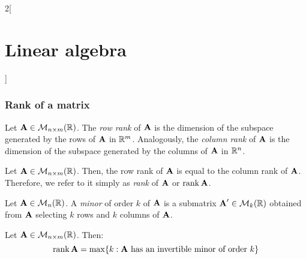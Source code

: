 \documentclass[../../../main_math.tex]{subfiles}
\begin{document}
\begin{multicols}{2}[\section{Linear algebra}]
  \subsubsection{Rank of a matrix}
  \begin{definition}
    Let $\boldsymbol{\mathrm{A}}\in\mathcal{M}_{n\times m}(\mathbb{R})$. The \emph{row rank} of $\boldsymbol{\mathrm{A}}$ is the dimension of the subspace generated by the rows of $\boldsymbol{\mathrm{A}}$ in $\mathbb{R}^m$. Analogously, the \emph{column rank} of $\boldsymbol{\mathrm{A}}$ is the dimension of the subspace generated by the columns of $\boldsymbol{\mathrm{A}}$ in $\mathbb{R}^n$.
  \end{definition}
  \begin{proposition}
    Let $\boldsymbol{\mathrm{A}}\in\mathcal{M}_{n\times m}(\mathbb{R})$. Then, the row rank of $\boldsymbol{\mathrm{A}}$ is equal to the column rank of $\boldsymbol{\mathrm{A}}$. Therefore, we refer to it simply as \emph{rank} of $\boldsymbol{\mathrm{A}}$ or $\rank\boldsymbol{\mathrm{A}}$.
  \end{proposition}
  \begin{definition}
    Let $\boldsymbol{\mathrm{A}}\in\mathcal{M}_n(\mathbb{R})$. A \emph{minor} of order $k$ of $\boldsymbol{\mathrm{A}}$ is a submatrix $\boldsymbol{\mathrm{A}}'\in\mathcal{M}_k(\mathbb{R})$ obtained from $\boldsymbol{\mathrm{A}}$ selecting $k$ rows and $k$ columns of $\boldsymbol{\mathrm{A}}$.
  \end{definition}
  \begin{proposition}
    Let $\boldsymbol{\mathrm{A}}\in\mathcal{M}_{n\times m}(\mathbb{R})$. Then:
    $$\rank\boldsymbol{\mathrm{A}}=\max\{k:\text{$\boldsymbol{\mathrm{A}}$\ has an invertible minor of order $k$}\}$$
  \end{proposition}

\end{multicols}
\end{document}
